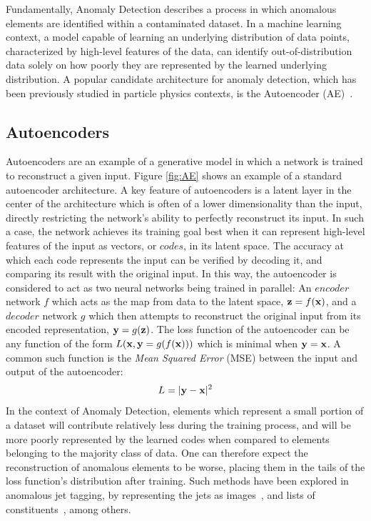 \documentclass[12pt, a4paper]{article}
\begin{document}
Fundamentally, Anomaly Detection describes a process in which anomalous elements are identified within a contaminated dataset. 
In a machine learning context, a model capable of learning an underlying distribution of data points, characterized by high-level features of the data, can identify out-of-distribution data solely on how poorly they are represented by the learned underlying distribution. A popular candidate architecture for anomaly detection, which has been previously studied in particle physics contexts, is the Autoencoder (AE)~\cite{bank2020autoencoders, Farina_2020}.

\subsection{Autoencoders}

Autoencoders are an example of a generative model in which a network is trained to reconstruct a given input. 
Figure \ref{fig:AE} shows an example of a standard autoencoder architecture.
A key feature of autoencoders is a latent layer in the center of the architecture which is often of a lower dimensionality than the input, directly restricting the network's ability to perfectly reconstruct its input. 
In such a case, the network achieves its training goal best when it can represent high-level features of the input as vectors, or $codes$, in its latent space. 
The accuracy at which each code represents the input can be verified by decoding it, and comparing
its result with the original input. In this way, the autoencoder is considered
to act as two neural networks being trained in parallel: An $encoder$ network $f$
which acts as the map from data to the latent space, ${\textbf z}=f({\textbf x})$, and
a $decoder$ network $g$ which then attempts to reconstruct the original input from 
its encoded representation, ${\textbf y}=g({\textbf z})$. The loss function of the
autoencoder can be any function of the form $L({\textbf x}, {\textbf y}=g(f({\textbf x})))$ which 
is minimal when ${\textbf y}={\textbf x}$. A common such function is the {\it Mean Squared Error} (MSE)
between the input and output of the autoencoder:
\[L=|{\textbf y} - {\textbf x}|^2\]
In the context of Anomaly Detection, elements which represent a small portion of
a dataset will contribute relatively less during the training process, and will
be more poorly represented by the learned codes when compared to elements belonging to the majority class of data. One
can therefore expect the reconstruction of anomalous elements to be worse, placing them in the
tails of the loss function's distribution after training. Such methods have been 
explored in anomalous jet tagging, by representing the jets as images~\cite{Farina_2020}, and lists 
of constituents~\cite{Heimel_2019}, among others. 
\end{document}
